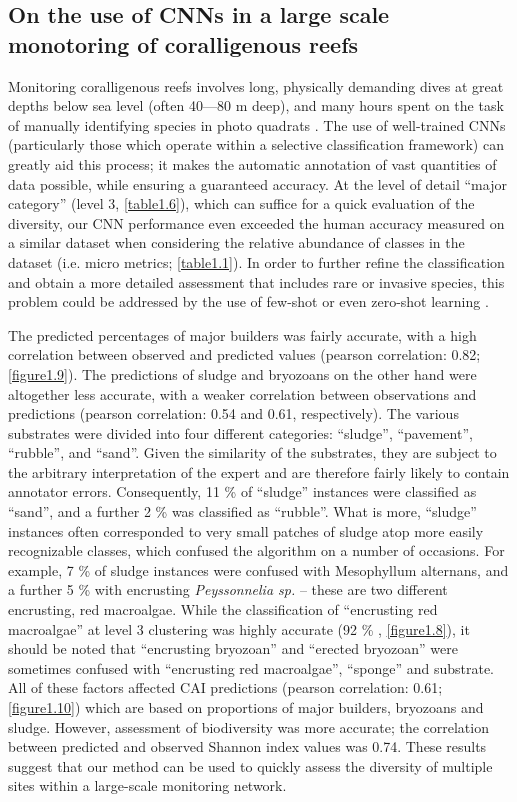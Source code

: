 \subsection{On the use of CNNs in a large scale monotoring of coralligenous reefs}\label{chapitre1_7.4}
Monitoring coralligenous reefs involves long, physically demanding dives at great depths below sea level (often 40---80 m deep), and many hours spent on the task of manually identifying species in photo quadrats \citep{deter_rapid_2012}. The use of well-trained CNNs (particularly those which operate within a selective classification framework) can greatly aid this process; it makes the automatic annotation of vast quantities of data possible, while ensuring a guaranteed accuracy. At the level of detail “major category” (level 3, \autoref{table1.6}), which can suffice for a quick evaluation of the diversity, our CNN performance even exceeded the human accuracy measured on a similar dataset when considering the relative abundance of classes in the dataset (i.e. micro metrics; \autoref{table1.1}). In order to further refine the classification and obtain a more detailed assessment that includes rare or invasive species, this problem could be addressed by the use of few-shot or even zero-shot learning \citep{liu_generalized_2018}.

The predicted percentages of major builders was fairly accurate, with a high correlation between observed and predicted values (pearson correlation: 0.82; \autoref{figure1.9}). The predictions of sludge and bryozoans on the other hand were altogether less accurate, with a weaker correlation between observations and predictions (pearson correlation: 0.54 and 0.61, respectively). The various substrates were divided into four different categories: “sludge”, “pavement”, “rubble”, and “sand”. Given the similarity of the substrates, they are subject to the arbitrary interpretation of the expert and are therefore fairly likely to contain annotator errors. Consequently, 11 \% of “sludge” instances were classified as “sand”, and a further 2 \% was classified as “rubble”. What is more, “sludge” instances often corresponded to very small patches of sludge atop more easily recognizable classes, which confused the algorithm on a number of occasions. For example, 7 \% of sludge instances were confused with Mesophyllum alternans, and a further 5 \% with encrusting \textit{Peyssonnelia sp.} – these are two different encrusting, red macroalgae. While the classification of “encrusting red macroalgae” at level 3 clustering was highly accurate (92 \% , \autoref{figure1.8}), it should be noted that “encrusting bryozoan” and “erected bryozoan” were sometimes confused with “encrusting red macroalgae”, “sponge” and substrate. All of these factors affected CAI predictions (pearson correlation: 0.61; \autoref{figure1.10}) which are based on proportions of major builders, bryozoans and sludge. However, assessment of biodiversity was more accurate; the correlation between predicted and observed Shannon index values was 0.74. These results suggest that our method can be used to quickly assess the diversity of multiple sites within a large-scale monitoring network.

